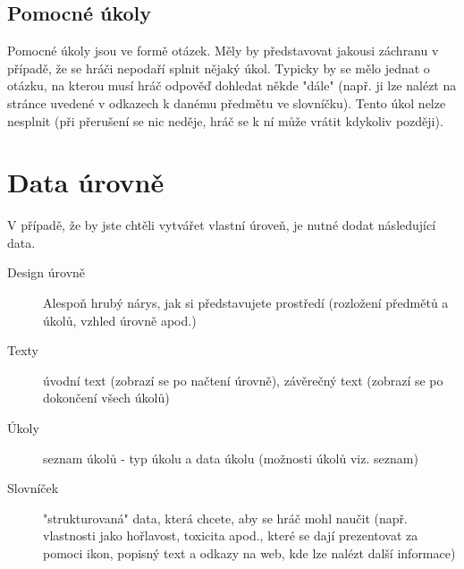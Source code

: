 \documentclass[a4paper,12pt]{article}
\begin{document}
\subsection{Pomocné úkoly}
Pomocné úkoly jsou ve formě otázek. Měly by představovat jakousi záchranu v případě, že se hráči nepodaří splnit nějaký úkol. Typicky by se mělo  jednat o otázku, na kterou musí hráč odpověď dohledat někde "dále" (např. ji lze nalézt na stránce uvedené v odkazech k danému předmětu ve slovníčku). Tento úkol nelze nesplnit (při přerušení se nic neděje, hráč se k ní může vrátit kdykoliv později).
\newpage
\section{Data úrovně}
V případě, že by jste chtěli vytvářet vlastní úroveň, je nutné dodat následující data.\\
\begin{description}
\item[Design úrovně] Alespoň hrubý nárys, jak si představujete prostředí (rozložení předmětů a úkolů, vzhled úrovně apod.)
\item[Texty] úvodní text (zobrazí se po načtení úrovně), závěrečný text (zobrazí se po dokončení všech úkolů)
\item[Úkoly] seznam úkolů - typ úkolu a data úkolu (možnosti úkolů viz. seznam) 
\item[Slovníček] "strukturovaná" data, která chcete, aby se hráč mohl naučit (např. vlastnosti jako hořlavost, toxicita apod., které se dají prezentovat za pomoci ikon, popisný text a odkazy na web, kde lze nalézt další informace)
\end{description}
\end{document}
